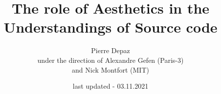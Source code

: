 \documentclass{book}
\begin{document}
\title{The role of Aesthetics in the Understandings of Source code}
\author{Pierre Depaz\\under the direction of Alexandre Gefen (Paris-3)\\and Nick Montfort (MIT)}
\date{last updated - 03.11.2021}
\maketitle



\pagebreak





\end{document}
